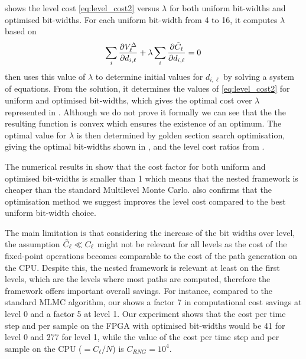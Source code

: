  shows the level cost \eqref{eq:level_cost2} versus $\lambda$ for both uniform bit-widths and optimised bit-widths. For each uniform bit-width from 4 to 16, it computes $\lambda$ based on
\begin{equation}
    \sum_i \dfrac{\partial V_\ell^{\Delta}}{\partial d_{i,\ell}} +\lambda \sum_i \dfrac{\partial \Tilde{C}_\ell}{\partial d_{i,\ell}} = 0
\end{equation}
then uses this value of $\lambda$ to determine initial values for $d_{i,\ell}$ by solving a system of equations. From the solution, it determines the values of \eqref{eq:level_cost2} for uniform and optimised bit-widths, which gives the optimal cost over $\lambda$ represented in . Although we do not prove it formally we can see that the 
the resulting function 
is convex which ensures the existence of an optimum.
The optimal value for $\lambda$ is then determined by golden section search optimisation,
giving the optimal bit-widths shown in , and the level cost ratios from . 

The numerical results in  show that the cost factor for both uniform and optimised bit-widths is smaller than 1 which means that the nested framework is cheaper than the standard Multilevel Monte Carlo.  also confirms that the optimisation method we suggest improves the level cost compared to the best uniform bit-width choice. 


The main limitation is that considering the increase of the bit widths over level, the assumption $\Tilde{C}_\ell \ll C_\ell$ might not be relevant for all levels as the cost of the fixed-point operations becomes comparable to the cost of the path generation on the CPU. 
Despite this, the nested framework is relevant at least on the first levels, which are the levels where most paths are computed, therefore the framework offers important overall savings. For instance, compared to the standard MLMC algorithm, our  shows a factor 7 in computational cost savings at level 0 and a factor 5 at level 1. Our experiment shows that the cost per time step and per sample on the FPGA with optimised bit-widths would be 41 for level 0 and 277 for level 1,
while the value of the cost per time step and per sample on the CPU ($=C_\ell/N$) is $C_{RNG}=10^4$.


